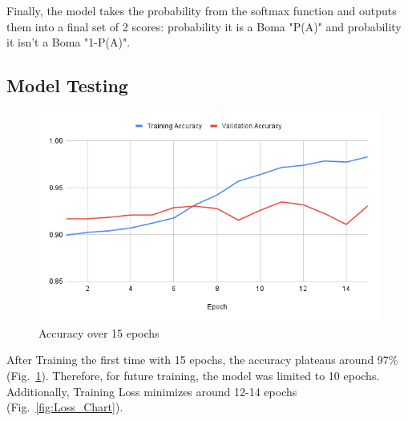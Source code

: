 \documentclass[10pt]{article}
\begin{document}
Finally, the model takes the probability from the softmax function and outputs them into a final set of 2 scores: probability it is a Boma "P(A)" and probability it isn't a Boma "1-P(A)".

\subsection{Model Testing}

\begin{figure} [H]
    \centering
    \includegraphics[width=1\linewidth]{images/Training Accuracy.png}
    \caption{Accuracy over 15 epochs}
    \label{fig:Accuracy_Chart}
\end{figure}

After Training the first time with 15 epochs, the accuracy plateaus around 97\% (Fig.~\ref{fig:Accuracy_Chart}). Therefore, for future training, the model was limited to 10 epochs. Additionally, Training Loss minimizes around 12-14 epochs (Fig.~\ref{fig:Loss_Chart}).
\end{document}
